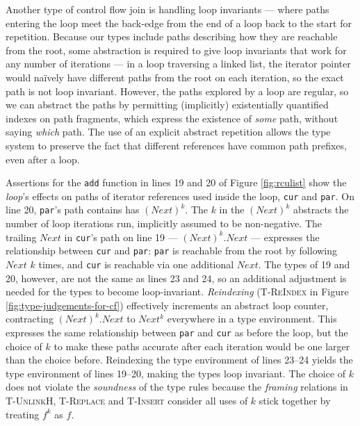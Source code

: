 Another type of control flow join is handling loop invariants --- where paths entering the loop meet the back-edge from the end of a loop back to the start for repetition.
Because our types include paths describing how they are reachable from the root, some abstraction is required to give loop invariants that work for any number of iterations --- in a loop traversing a linked list, the iterator pointer would na\"ively have different paths from the root on each iteration, so the exact path is not loop invariant.  However, the paths explored by a loop are regular, so we can abstract the paths by permitting (implicitly) existentially quantified indexes on path fragments, which express the existence of \emph{some} path, without saying \emph{which} path.  The use of an explicit abstract repetition allows the type system to preserve the fact that different references have common path prefixes, even after a loop.

Assertions for the \texttt{add} function in lines 19 and 20 of Figure \ref{fig:rculist} show the \textit{loop}'s effects on paths of iterator references used inside the loop, \texttt{cur} and \texttt{par}. 
On line 20, \texttt{par}'s path contains has $(Next)^{k}$.
The $k$ in the $(Next)^{k}$ abstracts the number of loop iterations run, implicitly assumed to be non-negative.
The trailing $Next$ in \texttt{cur}'s path on line 19 --- $(Next)^{k}.Next$ --- expresses the relationship between \texttt{cur} and \texttt{par}: \texttt{par} is reachable from the root by following $Next$ $k$ times, and \texttt{cur} is reachable via one additional $Next$.
The types of 19 and 20, however, are not the same as lines 23 and 24, so an additional adjustment is needed for the types to become loop-invariant.
\emph{Reindexing} (\textsc{T-ReIndex} in Figure \ref{fig:type-judgements-for-cf}) effectively increments an abstract loop counter, contracting $(Next)^k.Next$ to $Next^k$ everywhere in a type environment.  This expresses the same relationship between \texttt{par} and \texttt{cur} as before the loop, but the choice of $k$ to make these paths accurate after each iteration would be one larger than the choice before.
Reindexing the type environment of lines 23--24 yields the type environment of lines 19--20, making the types loop invariant. The choice of $k$ does not violate the \textit{soundness} of the type rules because the \textit{framing} relations in \textsc{T-UnlinkH}, \textsc{T-Replace} and \textsc{T-Insert} consider all uses of $k$ stick together by treating $f^{k}$ as $f$.

